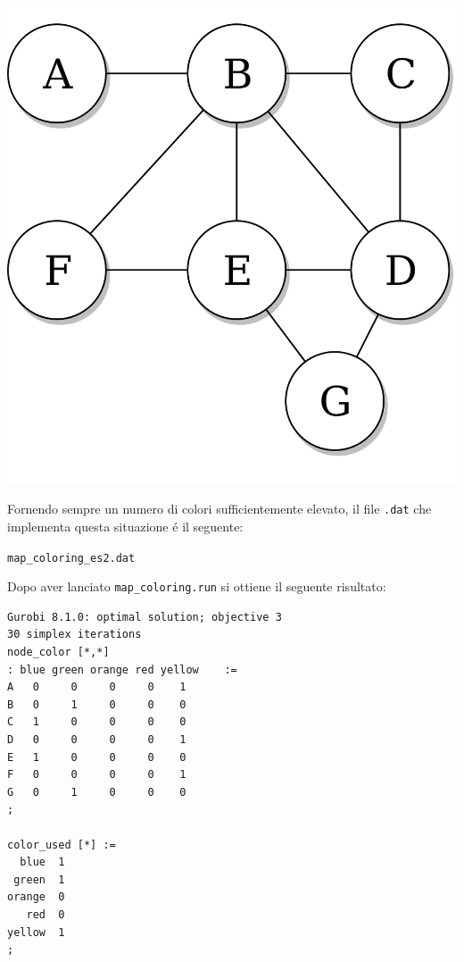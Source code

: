 \documentclass{article}
\begin{document}
\begin{center}
\includegraphics[scale=0.2]{non_complete_graph.png}
\end{center}


Fornendo sempre un numero di colori sufficientemente elevato, il file \texttt{.dat} che implementa questa situazione \'e il seguente:

\vspace{5mm}
\texttt{map\_coloring\_es2.dat}

\vspace{5mm}

Dopo aver lanciato \texttt{map\_coloring.run} si ottiene il seguente risultato:\\
\begin{verbatim}
Gurobi 8.1.0: optimal solution; objective 3
30 simplex iterations
node_color [*,*]
: blue green orange red yellow    :=
A   0     0     0     0    1
B   0     1     0     0    0
C   1     0     0     0    0
D   0     0     0     0    1
E   1     0     0     0    0
F   0     0     0     0    1
G   0     1     0     0    0
;

color_used [*] :=
  blue  1
 green  1
orange  0
   red  0
yellow  1
;
\end{verbatim}
\end{document}
